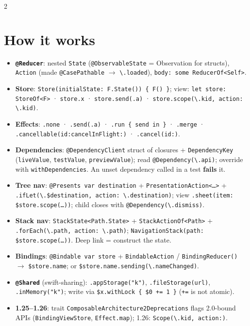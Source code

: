 \documentclass[8pt]{extarticle}
\newcommand\kp[1]{\texttt{\textbackslash.#1}}
\begin{document}
\begin{multicols}{2}
\raggedright

\section{How it works}
\begin{itemize}
  \item \textbf{\texttt{@Reducer}}: nested \texttt{State} (\texttt{@ObservableState} = Observation
        for structs), \texttt{Action} (made \texttt{@CasePathable} $\to$ \kp{loaded}),
        \texttt{body: some ReducerOf<Self>}.
  \item \textbf{Store}: \texttt{Store(initialState: F.State()) \{ F() \}}; view:
        \texttt{let store: StoreOf<F>} · \texttt{store.x} · \texttt{store.send(.a)} ·
        \texttt{store.scope(\kp{kid}, action: \kp{kid})}.
  \item \textbf{Effects}: \texttt{.none} · \texttt{.send(.a)} · \texttt{.run \{ send in \}} ·
        \texttt{.merge} · \texttt{.cancellable(id:cancelInFlight:)} · \texttt{.cancel(id:)}.
  \item \textbf{Dependencies}: \texttt{@DependencyClient} struct of closures +
        \texttt{DependencyKey} (\texttt{liveValue}, \texttt{testValue}, \texttt{previewValue});
        read \texttt{@Dependency(\kp{api})}; override with \texttt{withDependencies}. An unset
        dependency called in a test \textbf{fails} it.
  \item \textbf{Tree nav}: \texttt{@Presents var destination} +
        \texttt{PresentationAction<…>} + \texttt{.ifLet(\kp{\$destination}, action:
        \kp{destination})}; view \texttt{.sheet(item: \$store.scope(…))}; child closes with
        \texttt{@Dependency(\kp{dismiss})}.
  \item \textbf{Stack nav}: \texttt{StackState<Path.State>} + \texttt{StackActionOf<Path>} +
        \texttt{.forEach(\kp{path}, action: \kp{path})}; \texttt{NavigationStack(path:
        \$store.scope(…))}. Deep link = construct the state.
  \item \textbf{Bindings}: \texttt{@Bindable var store} + \texttt{BindableAction} /
        \texttt{BindingReducer()} $\to$ \texttt{\$store.name}; or
        \texttt{\$store.name.sending(\kp{nameChanged})}.
  \item \textbf{\texttt{@Shared}} (swift-sharing): \texttt{.appStorage("k")},
        \texttt{.fileStorage(url)}, \texttt{.inMemory("k")}; write via
        \texttt{\$x.withLock \{ \$0 += 1 \}} (\texttt{+=} is not atomic).
  \item \textbf{1.25–1.26}: trait \texttt{ComposableArchitecture2Deprecations} flags 2.0-bound
        APIs (\texttt{BindingViewStore}, \texttt{Effect.map}); 1.26: \texttt{Scope(\kp{kid}, action:)}.
\end{itemize}


\end{multicols}
\end{document}

